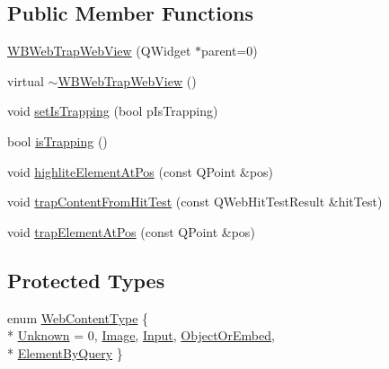 \subsection*{Public Member Functions}
\begin{DoxyCompactItemize}
\item 
\hyperlink{class_w_b_web_trap_web_view_a317876fd51d7292ae634fd89b4b66de7}{W\-B\-Web\-Trap\-Web\-View} (Q\-Widget $\ast$parent=0)
\item 
virtual \hyperlink{class_w_b_web_trap_web_view_a946554531e60593a1b3aac1c4f124d77}{$\sim$\-W\-B\-Web\-Trap\-Web\-View} ()
\item 
void \hyperlink{class_w_b_web_trap_web_view_a69a4cb6a908c732ba48906d35abea0ea}{set\-Is\-Trapping} (bool p\-Is\-Trapping)
\item 
bool \hyperlink{class_w_b_web_trap_web_view_a5f010b9c648642f536b5add27dd68cd8}{is\-Trapping} ()
\item 
void \hyperlink{class_w_b_web_trap_web_view_a838843164510c7510c16a2d6b72ce043}{highlite\-Element\-At\-Pos} (const Q\-Point \&pos)
\item 
void \hyperlink{class_w_b_web_trap_web_view_a2ac308414d18186c9c4fc60bc5f46400}{trap\-Content\-From\-Hit\-Test} (const Q\-Web\-Hit\-Test\-Result \&hit\-Test)
\item 
void \hyperlink{class_w_b_web_trap_web_view_afdbfd6aac50cad5ac07a465baa7be0b6}{trap\-Element\-At\-Pos} (const Q\-Point \&pos)
\end{DoxyCompactItemize}
\subsection*{Protected Types}
\begin{DoxyCompactItemize}
\item 
enum \hyperlink{class_w_b_web_trap_web_view_a4cb16c98c564cf5258d2d1029531cebe}{Web\-Content\-Type} \{ \\*
\hyperlink{class_w_b_web_trap_web_view_a4cb16c98c564cf5258d2d1029531cebea61a5f9ea0d66f3f39e0fb55905873768}{Unknown} =  0, 
\hyperlink{class_w_b_web_trap_web_view_a4cb16c98c564cf5258d2d1029531cebeae33fc98b2c1e6df15517a42554be6e3e}{Image}, 
\hyperlink{class_w_b_web_trap_web_view_a4cb16c98c564cf5258d2d1029531cebea18afa5cfbeb6263f11bd7e866034a087}{Input}, 
\hyperlink{class_w_b_web_trap_web_view_a4cb16c98c564cf5258d2d1029531cebea1f15ef8a3733e444a258ce303d2ab16d}{Object\-Or\-Embed}, 
\\*
\hyperlink{class_w_b_web_trap_web_view_a4cb16c98c564cf5258d2d1029531cebeaab5cef4940a2c917bb22a03f0fde491f}{Element\-By\-Query}
 \}
\end{DoxyCompactItemize}
